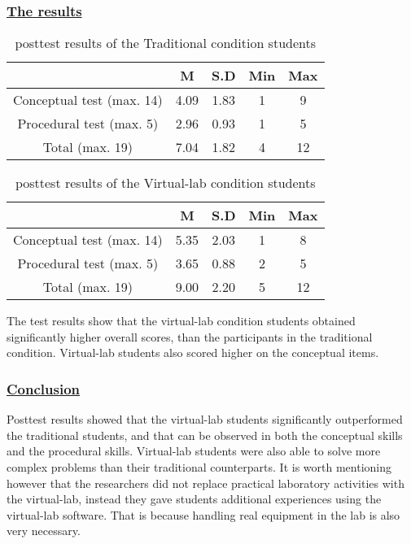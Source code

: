 \documentclass[../main.tex]{subfiles}
\begin{document}
\newpage
\subsubsection*{\underline{The results}}
\begin{table}[!ht]
    \caption{posttest results of the Traditional condition students}  
    \centering
    \begin{tabular}{|c|c|c|c|c|}
       \hline
         & M & S.D & Min & Max \\
       \hline
       Conceptual test (max. 14) & 4.09 & 1.83 & 1 & 9 \\
      \hline
       Procedural test (max. 5) & 2.96 & 0.93 & 1 & 5 \\
       \hline
       Total (max. 19) & 7.04 & 1.82 & 4 & 12 \\
       \hline
       \end{tabular}
    \label{tab:3}
\end{table}
\begin{table}[!ht]
    \caption{posttest results of the Virtual-lab condition students}  
    \centering
    \begin{tabular}{|c|c|c|c|c|}
       \hline
         & M & S.D & Min & Max \\
       \hline
       Conceptual test (max. 14) & 5.35 & 2.03 & 1 & 8 \\
      \hline
       Procedural test (max. 5) & 3.65 & 0.88 & 2 & 5 \\
       \hline
       Total (max. 19) & 9.00 & 2.20 & 5 & 12 \\
       \hline
       \end{tabular}
    \label{tab:4}
\end{table}

The test results show that the virtual-lab condition students obtained significantly higher overall scores, than the participants in the traditional condition. Virtual-lab students also scored higher on the conceptual items.

\subsubsection*{\underline{Conclusion}}
Posttest results showed that the virtual-lab students significantly outperformed the traditional students, and that can be observed in both the conceptual skills and the procedural skills. Virtual-lab students were also able to solve more complex problems than their traditional counterparts. It is worth mentioning however that the researchers did not replace practical laboratory activities with the virtual-lab, instead they gave students additional experiences using the virtual-lab software. That is because handling real equipment in the lab is also very necessary.
\end{document}
